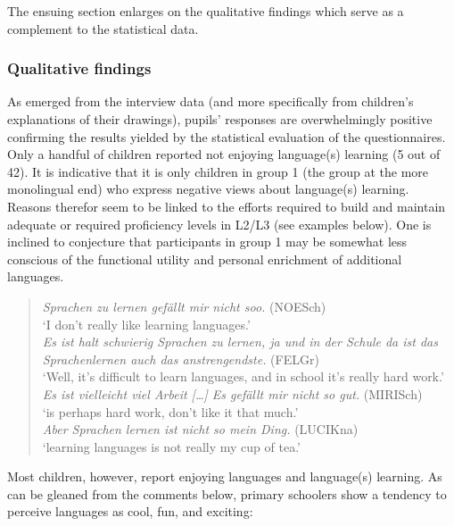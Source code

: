 \documentclass[output=paper]{../langscibook}
\begin{document}
The ensuing section enlarges on the qualitative findings which serve as a complement to the statistical data.


\subsubsection{Qualitative findings}

As emerged from the interview data (and more specifically from children’s explanations of their drawings), pupils’ responses are overwhelmingly positive confirming the results yielded by the statistical evaluation of the questionnaires. Only a handful of children reported not enjoying language(s) learning (5 out of 42). It is indicative that it is only children in group 1 (the group at the more monolingual end) who express negative views about language(s) learning. Reasons therefor seem to be linked to the efforts required to build and maintain adequate or required proficiency levels in L2/L3 (see examples below). One is inclined to conjecture that participants in group 1 may be somewhat less conscious of the functional utility and personal enrichment of additional languages.

\begin{quote}\sloppy
\textit{Sprachen zu lernen gefällt mir nicht soo.} (NOESch)\\
`I don’t really like learning languages.'\medskip\\
\textit{Es ist halt schwierig Sprachen zu lernen, ja und in der Schule da ist das Sprachenlernen auch das anstrengendste.} (FELGr)\\
`Well, it’s difficult to learn languages, and in school it’s really hard work.'\medskip\\
\textit{Es ist vielleicht viel Arbeit […] Es gefällt mir nicht so gut.} (MIRISch)\\
`is perhaps hard work, don’t like it that much.'\medskip\\
\textit{Aber Sprachen lernen ist nicht so mein Ding.} (LUCIKna)\\
`learning languages is not really my cup of tea.'
\end{quote}

Most children, however, report enjoying languages and language(s) learning. As can be gleaned from the comments below, primary schoolers show a tendency to perceive languages as cool, fun, and exciting:
\end{document}

